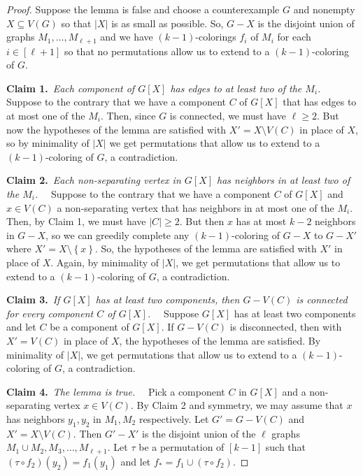 \documentclass[12pt]{article}
\theoremstyle{plain}
\theoremstyle{definition}
\theoremstyle{remark}
\newcommand{\set}[1]{\left\{ #1 \right\}}
\newcommand{\irange}[1]{\left[#1\right]}
\newcommand{\claim}[2]{{\bf Claim #1.}~{\it #2}~~}
\begin{document}
\begin{proof}
Suppose the lemma is false and choose a counterexample $G$ and nonempty $X \subseteq V(G)$ so that $|X|$ is as small as possible.  So, $G-X$ is the disjoint union of graphs $M_1, \ldots, M_{\ell + 1}$ and we have $(k-1)$-colorings $f_i$ of $M_i$ for each $i \in \irange{\ell + 1}$ so that no permutations allow us to extend to a $(k - 1)$-coloring of $G$.

\claim{1}{Each component of $G[X]$ has edges to at least two of the $M_i$.}
Suppose to the contrary that we have a component $C$ of $G[X]$ that has edges to at most one of the $M_i$.  Then, since $G$ is connected, we must have $\ell \ge 2$. But now the hypotheses of the lemma are satisfied with $X' = X \setminus V(C)$ in place of $X$, so by minimality of $|X|$ we get permutations that allow us to extend to a $(k - 1)$-coloring of $G$, a contradiction.

\claim{2}{Each non-separating vertex in $G[X]$ has neighbors in at least two of the $M_i$.}
Suppose to the contrary that we have a component $C$ of $G[X]$ and $x \in V(C)$ a non-separating vertex that has neighbors in at most one of the $M_i$.  Then, by Claim 1, we must have $|C| \ge 2$.  But then $x$ has at most $k-2$ neighbors in $G-X$, so we can greedily complete any $(k-1)$-coloring of $G-X$ to $G-X'$ where $X' = X \setminus \set{x}$.  So, the hypotheses of the lemma are satisfied with $X'$ in place of $X$.  Again, by minimality of $|X|$, we get permutations that allow us to extend to a $(k - 1)$-coloring of $G$, a contradiction.

\claim{3}{If $G[X]$ has at least two components, then $G - V(C)$ is connected for every component $C$ of $G[X]$.}
Suppose $G[X]$ has at least two components and let $C$ be a component of $G[X]$.  If $G-V(C)$ is disconnected, then with $X'=V(C)$ in place of $X$, the hypotheses of the lemma are satisfied. By minimality of $|X|$, we get permutations that allow us to extend to a $(k - 1)$-coloring of $G$, a contradiction.

\claim{4}{The lemma is true.}
Pick a component $C$ in $G[X]$ and a non-separating vertex $x \in V(C)$.  By Claim 2 and symmetry, we may assume that $x$ has neighbors $y_1, y_2$ in $M_1, M_2$ respectively.  Let $G' = G - V(C)$ and $X' = X \setminus V(C)$.  Then $G' - X'$ is the disjoint union of the $\ell$ graphs $M_1 \cup M_2, M_3, \ldots, M_{\ell + 1}$.  Let $\tau$ be a permutation of $\irange{k-1}$ such that $(\tau \circ f_2)(y_2) = f_1(y_1)$ and let $f_* = f_1 \cup (\tau \circ f_2)$. 


\end{proof}
\end{document}
